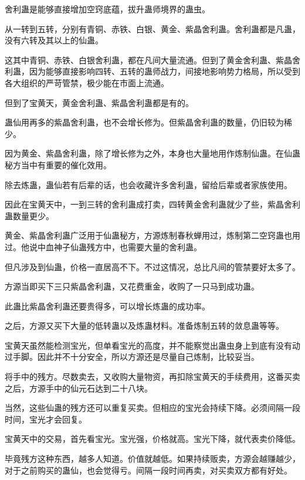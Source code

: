 
\begin{this_body}

舍利蛊是能够直接增加空窍底蕴，拔升蛊师境界的蛊虫。

从一转到五转，分别有青铜、赤铁、白银、黄金、紫晶舍利蛊。舍利蛊都是凡蛊，没有六转及其以上的仙蛊。

这其中青铜、赤铁、白银舍利蛊，都在凡间大量流通。但到了黄金舍利蛊、紫晶舍利蛊，因为能够直接影响四转、五转的蛊师战力，间接地影响势力格局，所以受到各大组织的严苛管禁，极少能在市面上流通。

但到了宝黄天，黄金舍利蛊、紫晶舍利蛊都是有的。

蛊仙用再多的紫晶舍利蛊，也不会增长修为。但紫晶舍利蛊的数量，仍旧较为稀少。

因为黄金、紫晶舍利蛊，除了增长修为之外，本身也大量地用作炼制仙蛊。在仙蛊秘方当中有重要的催化效用。

除去炼蛊，蛊仙若有后辈的话，也会收藏许多舍利蛊，留给后辈或者家族使用。

因此在宝黄天中，一到三转的舍利蛊成打卖，四转黄金舍利蛊就少了些，紫晶舍利蛊数量更少。

黄金、紫晶舍利蛊广泛用于仙蛊秘方，方源炼制春秋蝉用过，炼制第二空窍蛊也用过。他说中血神子仙蛊残方中，也需要大量的舍利蛊。

但凡涉及到仙蛊，价格一直居高不下。不过这情况，总比凡间的管禁要好太多了。

方源当即买下三只紫晶舍利蛊，又花费重金，收购了一只马到成功蛊。

此蛊比紫晶舍利蛊还要贵得多，可以增长炼蛊的成功率。

之后，方源又买下大量的低转蛊以及炼蛊材料。准备炼制五转的敛息蛊等等。

宝黄天虽然能检测宝光，但单看宝光的高度，并不能察觉出蛊虫身上到底有没有动过手脚。因此并不十分安全，所以方源还是尽量自己炼制，比较妥当。

将手中的残方。尽数卖去，又收购大量物资，再扣除宝黄天的手续费用，这番买卖之后，方源手中的仙元石达到二十八块。

当然，这些仙蛊的残方还可以重复买卖。但相应的宝光会持续下降。必须间隔一段时间，宝光才会回复。

宝黄天中的交易，首先看宝光。宝光强，价格就高。宝光下降，就代表卖价降低。

毕竟残方这种东西，越多人知道。价值就越低。如果持续贩卖，方源会越赚越少，对于之前购买的蛊仙，也会觉得亏。间隔一段时间再卖，对买卖双方都有好处。


\end{this_body}
